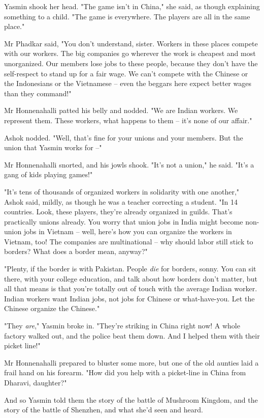 Yasmin shook her head. "The game isn't in China," she said, as
though explaining something to a child. "The game is everywhere.
The players are all in the same place."

Mr Phadkar said, "You don't understand, sister. Workers in these
places compete with our workers. The big companies go wherever the
work is cheapest and most unorganized. Our members lose jobs to
these people, because they don't have the self-respect to stand up
for a fair wage. We can't compete with the Chinese or the
Indonesians or the Vietnamese -- even the beggars here expect
better wages than they command!"

Mr Honnenahalli patted his belly and nodded. "We are Indian
workers. We represent them. These workers, what happens to them --
it's none of our affair."

Ashok nodded. "Well, that's fine for your unions and your members.
But the union that Yasmin works for --"

Mr Honnenahalli snorted, and his jowls shook. "It's not a union,"
he said. "It's a gang of kids playing games!"

"It's tens of thousands of organized workers in solidarity with one
another," Ashok said, mildly, as though he was a teacher correcting
a student. "In 14 countries. Look, these players, they're already
organized in guilds. That's practically unions already. You worry
that union jobs in India might become non-union jobs in Vietnam --
well, here's how you can organize the workers in Vietnam, too! The
companies are multinational -- why should labor still stick to
borders? What does a border mean, anyway?"

"Plenty, if the border is with Pakistan. People \emph{die} for
borders, sonny. You can sit there, with your college education, and
talk about how borders don't matter, but all that means is that
you're totally out of touch with the average Indian worker. Indian
workers want Indian jobs, not jobs for Chinese or what-have-you.
Let the Chinese organize the Chinese."

"They \emph{are}," Yasmin broke in. "They're striking in China
right now! A whole factory walked out, and the police beat them
down. And I helped them with their picket line!"

Mr Honnenahalli prepared to bluster some more, but one of the old
aunties laid a frail hand on his forearm. "How did you help with a
picket-line in China from Dharavi, daughter?"

And so Yasmin told them the story of the battle of Mushroom
Kingdom, and the story of the battle of Shenzhen, and what she'd
seen and heard.

